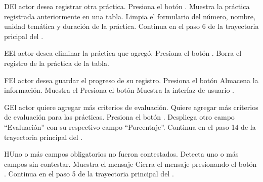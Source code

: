 
\begin{UCtrayectoriaA}{D}{El actor desea registrar otra práctica.}
    \UCpaso[\UCactor] Presiona el botón .
    \UCpaso Muestra la práctica registrada anteriormente en una tabla.
    \UCpaso Limpia el formulario del número, nombre, unidad temática y duración de la práctica.
    \UCpaso Continua en el paso 6 de la trayectoria pricipal del .
\end{UCtrayectoriaA}


\begin{UCtrayectoriaA}{E}{El actor desea eliminar la práctica que agregó.}
    \UCpaso[\UCactor] Presiona el botón .
    \UCpaso Borra el registro de la práctica de la tabla.
\end{UCtrayectoriaA}


\begin{UCtrayectoriaA}{F}{El actor desea guardar el progreso de su registro.}
\UCpaso[\UCactor] Presiona el botón 
\UCpaso Almacena la información.
\UCpaso Muestra el 
\UCpaso[\UCactor] Presiona el botón  
\UCpaso Muestra la interfaz de usuario .
\end{UCtrayectoriaA}


\begin{UCtrayectoriaA}{G}{El actor quiere agregar más criterios de evaluación.}
    \UCpaso[\UCactor] Quiere agregar más criterios de evaluación para las prácticas.
    \UCpaso[\UCactor] Presiona el botón .
    \UCpaso Despliega otro campo ``Evaluación'' con su respectivo campo ``Porcentaje''.
    \UCpaso Continua en el paso 14 de la trayectoria principal del .
\end{UCtrayectoriaA}


\begin{UCtrayectoriaA}{H}{Uno o más campos obligatorios no fueron contestados.}
	\UCpaso Detecta uno o más campos sin contestar.
    \UCpaso Muestra el mensaje 
    \UCpaso[\UCactor] Cierra el mensaje presionando el botón .
    \UCpaso Continua en el paso 5 de la trayectoria principal del .
\end{UCtrayectoriaA}

